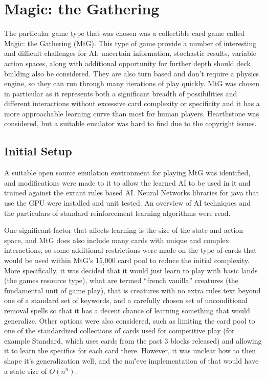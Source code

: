   \section{Magic: the Gathering}
  The particular game type that was chosen was a collectible card game called Magic: the Gathering (MtG). This type of game provide a number of interesting and difficult challenges for AI: uncertain information, stochastic results, variable action spaces, along with additional opportunity for further depth should deck building also be considered. They are also turn based and don't require a physics engine, so they can run through many iterations of play quickly. MtG was chosen in particular as it represents both a significant breadth of possibilities and different interactions without excessive card complexity or specificity and it has a more approachable learning curve than most for human players. Hearthstone was considered, but a suitable emulator was hard to find due to the copyright issues. 
 \subsection{Initial Setup}

  
      A suitable open source emulation environment for playing MtG was identified, and modifications were made to it to allow the learned AI to be used in it and trained against the extant rules based AI. Neural Networks libraries for java that use the GPU were installed and unit tested. An overview of AI techniques and the particulars of standard reinforcement learning algorithms were read.
      
One significant factor that affects learning is the size of the state and action space, and MtG does also include many cards with unique and complex interactions, so some additional restrictions were made on the type of cards that would be used within MtG's 15,000 card pool to reduce the initial complexity. More specifically, it was decided that it would just learn to play with basic lands (the games resource type), what are termed ``french vanilla'' creatures (the fundamental unit of game play), that is creatures with no extra rules text beyond one of a standard set of keywords, and a carefully chosen set of unconditional removal spells so that it has a decent chance of learning something that would generalize. Other options were also considered, such as limiting the card pool to one of the standardized collections of cards used for competitive play (for example Standard, which uses cards from the past 3 blocks released) and allowing it to learn the specifics for each card there. However, it was unclear how to then shape it's generalization well, and the na\i\''eve implementation of that would have a state size of $O(n^n)$. 


